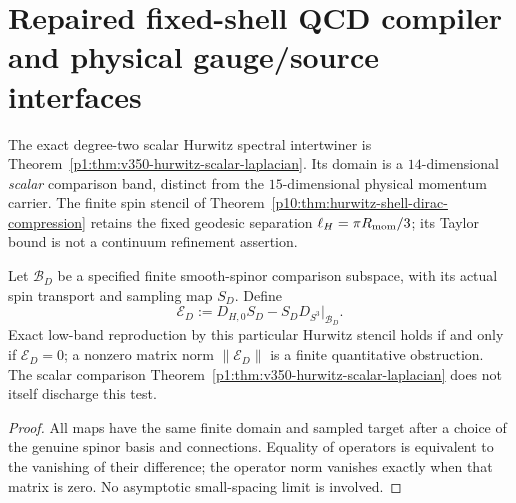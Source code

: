 \documentclass[12pt,a4paper]{article}
\begin{document}
\clearpage
\section{Repaired fixed-shell QCD compiler and physical gauge/source interfaces}
\label{p10:sec:v350-qcd-exact-repairs}
The exact degree-two scalar Hurwitz spectral intertwiner is
Theorem~\ref{p1:thm:v350-hurwitz-scalar-laplacian}. Its domain is a
$14$-dimensional \emph{scalar} comparison band, distinct from the
$15$-dimensional physical momentum carrier.  The finite spin stencil
of Theorem~\ref{p10:thm:hurwitz-shell-dirac-compression} retains the
fixed geodesic separation $\ell_H=\pi R_{\rm mom}/3$; its Taylor
bound is not a continuum refinement assertion.

\begin{proposition}
\label{p10:prop:v350-spinor-intertwining-certificate}
Let $\mathcal B_D$ be a specified finite smooth-spinor comparison
subspace, with its actual spin transport and sampling map $S_D$.
Define
\[
 \mathcal E_D:=D_{H,0}S_D-S_D D_{S^3}|_{\mathcal B_D}.
\]
Exact low-band reproduction by this particular Hurwitz stencil holds
if and only if $\mathcal E_D=0$; a nonzero matrix norm
$\|\mathcal E_D\|$ is a finite quantitative obstruction. The
scalar comparison Theorem~\ref{p1:thm:v350-hurwitz-scalar-laplacian}
does not itself discharge this test.
\end{proposition}
\begin{proof}
All maps have the same finite domain and sampled target after a
choice of the genuine spinor basis and connections. Equality of
operators is equivalent to the vanishing of their difference; the
operator norm vanishes exactly when that matrix is zero. No
asymptotic small-spacing limit is involved.
\end{proof}
\end{document}

